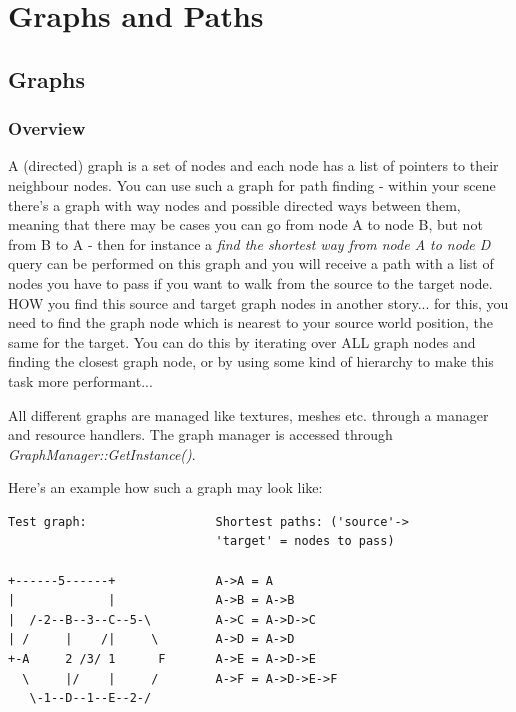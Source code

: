 \section{Graphs and Paths}




\subsection{Graphs}



\subsubsection{Overview}
A (directed) graph is a set of nodes and each node has a list of pointers to their neighbour nodes. You can use such a graph for path finding - within your scene there's a graph with way nodes and possible directed ways between them, meaning that there may be cases you can go from node A to node B, but not from B to A - then for instance a \emph{find the shortest way from node A to node D} query can be performed on this graph and you will receive a path with a list of nodes you have to pass if you want to walk from the source to the target node. HOW you find this source and target graph nodes in another story... for this, you need to find the graph node which is nearest to your source world position, the same for the target. You can do this by iterating over ALL graph nodes and finding the closest graph node, or by using some kind of hierarchy to make this task more performant...

All different graphs are managed like textures, meshes etc. through a manager and resource handlers. The graph manager is accessed through \emph{GraphManager::GetInstance()}.

Here's an example how such a graph may look like:

\begin{lstlisting}[caption=Graph example]
Test graph:                  Shortest paths: ('source'->
                             'target' = nodes to pass)

+------5------+              A->A = A
|             |              A->B = A->B
|  /-2--B--3--C--5-\         A->C = A->D->C
| /     |    /|     \        A->D = A->D
+-A     2 /3/ 1      F       A->E = A->D->E
  \     |/    |     /        A->F = A->D->E->F
   \-1--D--1--E--2-/

\end{lstlisting}

